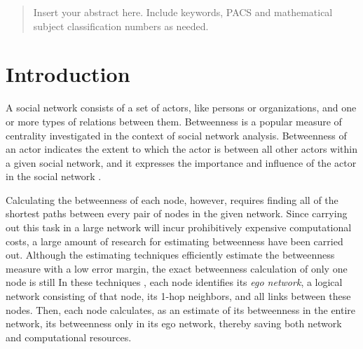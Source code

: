 \date{Received: date / Accepted: date}


\maketitle

\begin{abstract}
Insert your abstract here. Include keywords, PACS and mathematical
subject classification numbers as needed.
\end{abstract}

\section{Introduction}
\label{intro}
A social network consists of a set of actors, like persons or organizations, and one or more types of relations between them. 
Betweenness is a popular measure of centrality investigated in the context of social network analysis. 
Betweenness of an actor indicates the extent to which the actor is between all other actors within a given social network, and it expresses the importance and influence of the actor in the social network \citep{centrality}.

Calculating the betweenness of each node, however, requires finding all of the shortest paths between every pair of nodes in the given network.
Since carrying out this task in a large network will incur prohibitively expensive computational costs, a large amount of research for estimating betweenness have been carried out. Although the estimating techniques efficiently estimate the betweenness measure with a low error margin, the exact betweenness calculation of only one node is still    
In these techniques  \citep{SIMBET,egocentric,everett,ICCN:lbcdna,Pant13:Local}, each node identifies its \emph{ego network}, a logical network consisting of that node, its 1-hop neighbors, and all links between these nodes.
Then, each node calculates, as an estimate of its betweenness in the entire network, its betweenness only in its ego network, thereby saving both network and computational resources.


